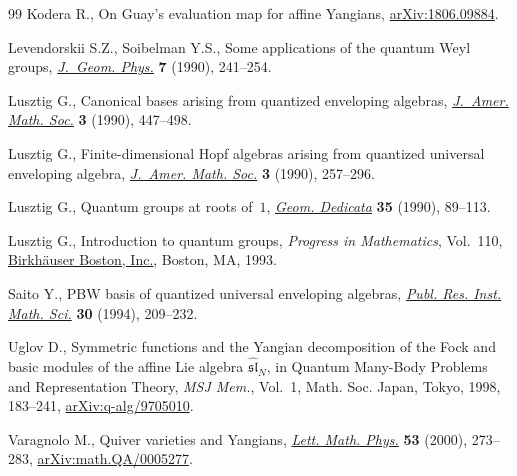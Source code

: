 \begin{thebibliography}{99}
Kodera R., On Guay's evaluation map for affine {Y}angians, \href{https://arxiv.org/abs/1806.09884}{arXiv:1806.09884}.

Levendorskii S.Z., Soibelman Y.S., Some applications of the quantum {W}eyl
 groups, \href{https://doi.org/10.1016/0393-0440(90)90013-S}{\textit{J.~Geom. Phys.}} \textbf{7} (1990), 241--254.

Lusztig G., Canonical bases arising from quantized enveloping algebras,
 \href{https://doi.org/10.2307/1990961}{\textit{J.~Amer. Math. Soc.}} \textbf{3} (1990), 447--498.

Lusztig G., Finite-dimensional {H}opf algebras arising from quantized universal
 enveloping algebra, \href{https://doi.org/10.2307/1990988}{\textit{J.~Amer. Math. Soc.}} \textbf{3} (1990), 257--296.

Lusztig G., Quantum groups at roots of~{$1$}, \href{https://doi.org/10.1007/BF00147341}{\textit{Geom. Dedicata}}
 \textbf{35} (1990), 89--113.

Lusztig G., Introduction to quantum groups, \textit{Progress in Mathematics},
 Vol.~110, \href{https://doi.org/10.1007/978-0-8176-4717-9}{Birkh\"{a}user Boston, Inc.}, Boston, MA, 1993.

Saito Y., P{BW} basis of quantized universal enveloping algebras, \href{https://doi.org/10.2977/prims/1195166130}{\textit{Publ.
 Res. Inst. Math. Sci.}} \textbf{30} (1994), 209--232.

Uglov D., Symmetric functions and the {Y}angian decomposition of the {F}ock and
 basic modules of the affine {L}ie algebra {$\widehat{\mathfrak{sl}}_N$}, in
 Quantum Many-Body Problems and Representation Theory, \textit{MSJ Mem.},
 Vol.~1, Math. Soc. Japan, Tokyo, 1998, 183--241, \href{https://arxiv.org/abs/q-alg/9705010}{arXiv:q-alg/9705010}.

Varagnolo M., Quiver varieties and {Y}angians, \href{https://doi.org/10.1023/A:1007674020905}{\textit{Lett. Math. Phys.}}
 \textbf{53} (2000), 273--283, \href{https://arxiv.org/abs/math.QA/0005277}{arXiv:math.QA/0005277}.

\end{thebibliography}
